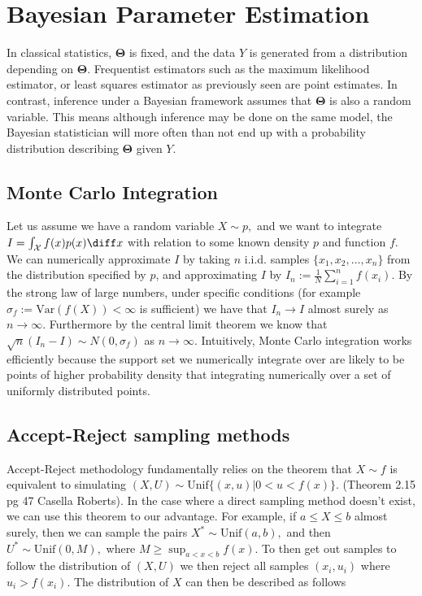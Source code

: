 \chapter{Bayesian Parameter Estimation}

In classical statistics, $\mathbf\Theta$ is fixed, and the data $Y$ is generated from a distribution depending on $\mathbf\Theta$. Frequentist estimators such as the maximum likelihood estimator, or least squares estimator as previously seen are point estimates. In contrast, inference under a Bayesian framework assumes that $\mathbf\Theta$ is also a random variable. This means although inference may be done on the same model, the Bayesian statistician will more often than not end up with a probability distribution describing $\mathbf\Theta$ given $Y$.

\color{red}
\section{Monte Carlo Integration}

Let us assume we have a random variable $X\sim p,$ and we want to integrate $I = \int_{\mathcal{X}} f(x)p(x)\diff x$ with relation to some known density $p$ and function $f$. We can numerically approximate $I$ by taking $n$ i.i.d. samples $\{x_1, x_2, \dots, x_n\}$ from the distribution specified by $p$, and approximating $I$ by $I_n:=\frac{1}{N}\sum_{i = 1}^nf(x_i).$ By the strong law of large numbers, under specific conditions (for example $\sigma_f := \mathrm{Var}(f(X))<\infty$ is sufficient) we have that $I_n \to I$ almost surely as $n\to\infty$. Furthermore by the central limit theorem we know that $\sqrt{n}(I_n - I) \sim N(0, \sigma_f)$ as $n\to\infty.$ Intuitively, Monte Carlo integration works efficiently because the support set we numerically integrate over are likely to be points of higher probability density that integrating numerically over a set of uniformly distributed points.

\section{Accept-Reject sampling methods}

Accept-Reject methodology fundamentally relies on the theorem that $X\sim f $ is equivalent to simulating $(X,U) \sim \mathrm{Unif}\{(x, u)|0<u<f(x)\}.$ (Theorem 2.15 pg 47 Casella Roberts). In the case where a direct sampling method doesn't exist, we can use this theorem to our advantage. For example, if $a \leq X \leq b$ almost surely, then we can sample the pairs $X^*\sim \mathrm{Unif}(a, b),$ and then $U^*\sim\mathrm{Unif}(0, M),$ where $M\geq \sup_{a<x<b} f(x).$ To then get out samples to follow the distribution of $(X, U)$ we then reject all samples $(x_i, u_i)$ where $u_i>f(x_i).$ The distribution of $X$ can then be described as follows

